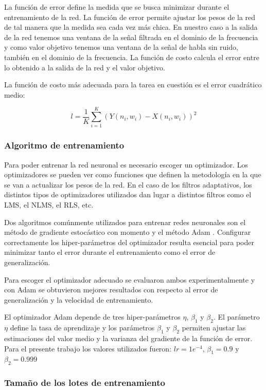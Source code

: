La función de error define la medida que se busca minimizar durante el entrenamiento de la red. La función de error permite ajustar los pesos de la red de tal manera que la medida sea cada vez más chica. En nuestro caso a la salida de la red tenemos una ventana de la señal filtrada en el dominio de la frecuencia y como valor objetivo tenemos una ventana de la señal de habla sin ruido, también en el dominio de la frecuencia. La función de costo calcula el error entre lo obtenido a la salida de la red y el valor objetivo. 

La función de costo más adecuada para la tarea en cuestión es el error cuadrático medio:

\begin{equation*}
	l = \frac{1}{K} \sum_{i=1}^K (Y(n_i, w_i) - X(n_i, w_i))^2
\end{equation*}

\subsubsection{Algoritmo de entrenamiento}

Para poder entrenar la red neuronal es necesario escoger un optimizador. Los optimizadores se pueden ver como funciones que definen la metodología en la que se van a actualizar los pesos de la red. En el caso de los filtros adaptativos, los distintos tipos de optimizadores utilizados dan lugar a distintos filtros como el LMS, el NLMS, el RLS, etc.

Dos algoritmos comúnmente utilizados para entrenar redes neuronales son el método de gradiente estocástico con momento \cite{deep_learning} y el método Adam \cite{adam_optimizer}. Configurar correctamente los hiper-parámetros del optimizador resulta esencial para poder minimizar tanto el error durante el entrenamiento como el error de generalización.

Para escoger el optimizador adecuado se evaluaron ambos experimentalmente y con Adam se obtuvieron mejores resultados con respecto al error de generalización y la velocidad de entrenamiento. 

El optimizador Adam depende de tres hiper-parámetros $\eta$, $\beta_1$ y $\beta_2$. El parámetro $\eta$ define la tasa de aprendizaje y los parámetros $\beta_1$ y $\beta_2$ permiten ajustar las estimaciones del valor medio y la varianza del gradiente de la función de error. Para el presente trabajo los valores utilizados fueron: $lr=1e^{-4}$, $\beta_1=0.9$ y $\beta_2=0.999$

\subsubsection{Tamaño de los lotes de entrenamiento}


